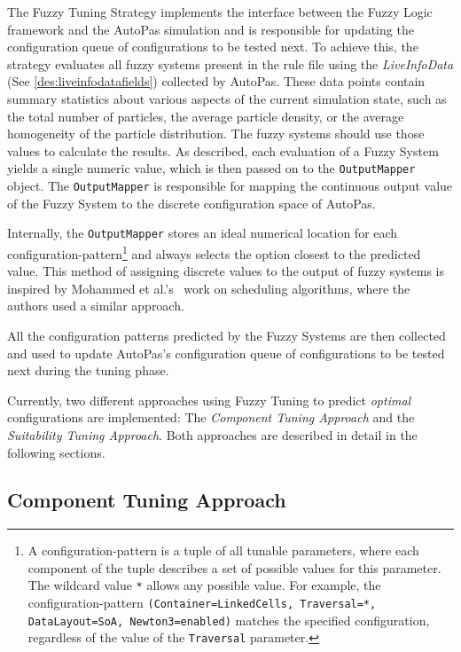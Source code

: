 The Fuzzy Tuning Strategy implements the interface between the Fuzzy Logic framework and the AutoPas simulation and is responsible for updating the configuration queue of configurations to be tested next. To achieve this, the strategy evaluates all fuzzy systems present in the rule file using the \emph{LiveInfoData} (See \ref{des:liveinfodatafields}) collected by AutoPas. These data points contain summary statistics about various aspects of the current simulation state, such as the total number of particles, the average particle density, or the average homogeneity of the particle distribution. The fuzzy systems should use those values to calculate the results. As described, each evaluation of a Fuzzy System yields a single numeric value, which is then passed on to the \texttt{OutputMapper} object. The \texttt{OutputMapper} is responsible for mapping the continuous output value of the Fuzzy System to the discrete configuration space of AutoPas.

Internally, the \texttt{OutputMapper} stores an ideal numerical location for each configuration-pattern\footnote{A configuration-pattern is a tuple of all tunable parameters, where each component of the tuple describes a set of possible values for this parameter. The wildcard value \texttt{*} allows any possible value. For example, the configuration-pattern \texttt{(Container=LinkedCells, Traversal=*, DataLayout=SoA, Newton3=enabled)} matches the specified configuration, regardless of the value of the \texttt{Traversal} parameter.} and always selects the option closest to the predicted value. This method of assigning discrete values to the output of fuzzy systems is inspired by Mohammed et al.'s~\cite{Mohammed2022} work on scheduling algorithms, where the authors used a similar approach.

All the configuration patterns predicted by the Fuzzy Systems are then collected and used to update AutoPas's configuration queue of configurations to be tested next during the tuning phase.


Currently, two different approaches using Fuzzy Tuning to predict \emph{optimal} configurations are implemented: The \emph{Component Tuning Approach} and the \emph{Suitability Tuning Approach}. Both approaches are described in detail in the following sections.


\subsection{Component Tuning Approach}
\label{sec:componentTuningApproach}

